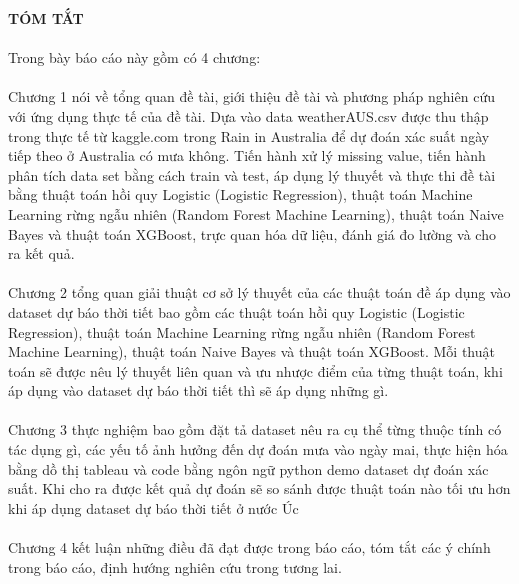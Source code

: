 \documentclass{article}
\begin{document}
\begin{center}
	\fontsize{16}{20}\selectfont
	\textbf{TÓM TẮT\\} 
\end{center}
	\fontsize{13}{13}\selectfont
	\paragraph{}
	Trong bày báo cáo này gồm có 4 chương:
	\paragraph{}Chương 1 nói về tổng quan đề tài, giới thiệu đề tài và phương pháp nghiên cứu với ứng dụng thực tế của đề tài. Dựa vào data weatherAUS.csv được thu thập trong thực tế  từ kaggle.com trong Rain in Australia để dự đoán xác suất ngày tiếp theo ở Australia có mưa không. Tiến hành xử lý missing value, tiến hành phân tích data set bằng cách train và test, áp dụng lý thuyết và thực thi đề tài bằng thuật toán hồi quy Logistic (Logistic Regression), thuật toán Machine Learning rừng ngẫu nhiên (Random Forest Machine Learning), thuật toán Naive Bayes và thuật toán XGBoost, trực quan hóa dữ liệu, đánh giá đo lường và cho ra kết quả.
	\paragraph{}Chương 2 tổng quan giải thuật cơ sở lý thuyết của các thuật toán đề áp dụng vào dataset dự báo thời tiết bao gồm các thuật toán  hồi quy Logistic (Logistic Regression), thuật toán Machine Learning rừng ngẫu nhiên (Random Forest Machine Learning), thuật toán Naive Bayes và thuật toán XGBoost. Mỗi thuật toán sẽ được nêu lý thuyết liên quan và ưu nhược điểm của từng thuật toán, khi áp dụng vào dataset dự báo thời tiết thì sẽ áp dụng những gì.
	\paragraph{}Chương 3 thực nghiệm bao gồm đặt tả dataset nêu ra cụ thể từng thuộc tính có tác dụng gì, các yếu tố ảnh hưởng đến dự đoán mưa vào ngày mai, thực hiện hóa bằng dồ thị tableau và code bằng ngôn ngữ python demo dataset dự đoán xác suất. Khi cho ra được kết quả dự đoán sẽ so sánh được thuật toán nào tối ưu hơn khi áp dụng dataset dự báo thời tiết ở nước Úc
	\paragraph{}Chương 4 kết luận những điều đã đạt được trong báo cáo, tóm tắt các ý chính trong báo cáo, định hướng nghiên cứu trong tương lai.
\pagebreak
\end{document}
